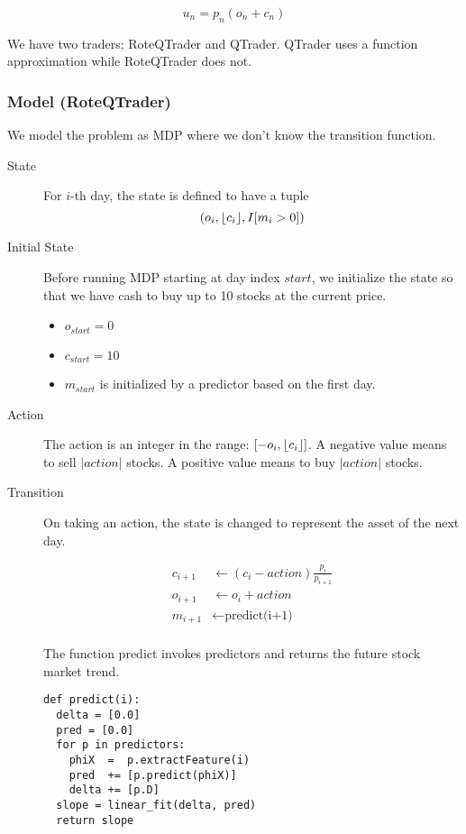 \documentclass[twocolumn,10pt]{asme2ej}
\DeclarePairedDelimiter\floor{\lfloor}{\rfloor}
\begin{document}
\[
u_n = p_n(o_n + c_n)
\]

We have two traders; RoteQTrader and QTrader. QTrader uses a function
approximation while RoteQTrader does not.

\subsubsection{Model (RoteQTrader)}

We model the problem as MDP where we don't know the transition function.

\begin{description}
\item[State] For $i$-th day, the state is defined to have a tuple
  \[
  (o_i,\floor*{c_i},I[m_i > 0])
  \]
\item[Initial State] Before running MDP starting at day index $start$,
  we initialize the state so that we have cash to buy up to 10 stocks
  at the current price.
  \begin{itemize}
  \item $o_{start} = 0$
  \item $c_{start} = 10$
  \item $m_{start}$ is initialized by a predictor based on the first day.
  \end{itemize}
  
\item[Action] The action is an integer in the range:
  $[-o_i,\floor*{c_i}]$. A negative value means to sell $|action|$
  stocks. A positive value means to buy $|action|$ stocks.

\item[Transition] On taking an action, the state is changed to
  represent the asset of the next day.

\begin{align*}
  c_{i+1} &\gets (c_{i} - action)\frac{p_i}{p_{i+1}} \\
  o_{i+1} &\gets o_{i} + action \\
  m_{i+1} &\gets \text{predict(i+1)} \\
\end{align*}

The function predict invokes predictors and returns the future stock market trend.

\begin{verbatim}
def predict(i):
  delta = [0.0]
  pred = [0.0]
  for p in predictors:
    phiX  =  p.extractFeature(i)
    pred  += [p.predict(phiX)]
    delta += [p.D]
  slope = linear_fit(delta, pred)
  return slope
\end{verbatim}


\end{description}
\end{document}
